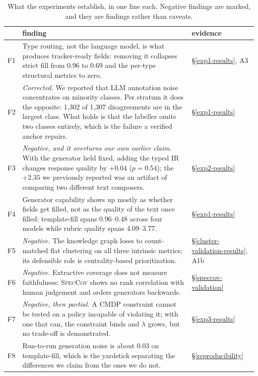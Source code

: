\documentclass[preprint,12pt]{elsarticle}
\begin{document}
\begin{table}[!htbp]\centering\footnotesize
\caption{What the experiments establish, in one line each. Negative findings are marked, and
they are findings rather than caveats.}\label{tab:findings}
\begin{tabular}{@{}p{0.6cm}p{7.6cm}p{2.4cm}@{}}\toprule
& finding & evidence \\\midrule
F1 & Type routing, not the language model, is what produces tracker-ready fields: removing it collapses strict fill from 0.96 to 0.69 and the per-type structural metrics to zero. & \S\ref{exp1-results}, A3 \\
F2 & \emph{Corrected.} We reported that LLM annotation noise concentrates on minority classes. Per stratum it does the opposite: 1{,}302 of 1{,}307 disagreements are in the largest class. What holds is that the labeller omits two classes entirely, which is the failure a verified anchor repairs. & \S\ref{exp1-results} \\
F3 & \emph{Negative, and it overturns our own earlier claim.} With the generator held fixed, adding the typed IR changes response quality by $+0.04$ ($p=0.54$); the $+2.35$ we previously reported was an artifact of comparing two different text composers. & \S\ref{exp2-results} \\
F4 & Generator capability shows up mostly as whether fields get filled, not as the quality of the text once filled: template-fill spans 0.96--0.48 across four models while rubric quality spans 4.09--3.77. & \S\ref{exp1-results} \\
F5 & \emph{Negative.} The knowledge graph loses to count-matched flat clustering on all three intrinsic metrics; its defensible role is centrality-based prioritization. & \S\ref{cluster-validation-results}, A1b \\
F6 & \emph{Negative.} Extractive coverage does not measure faithfulness: \textsc{SpecCov} shows no rank correlation with human judgement and orders generators backwards. & \S\ref{speccov-validation} \\
F7 & \emph{Negative, then partial.} A CMDP constraint cannot be tested on a policy incapable of violating it; with one that can, the constraint binds and $\lambda$ grows, but no trade-off is demonstrated. & \S\ref{exp3-results} \\
F8 & Run-to-run generation noise is about 0.03 on template-fill, which is the yardstick separating the differences we claim from the ones we do not. & \S\ref{reproducibility} \\
\bottomrule\end{tabular}\end{table}
\end{document}
